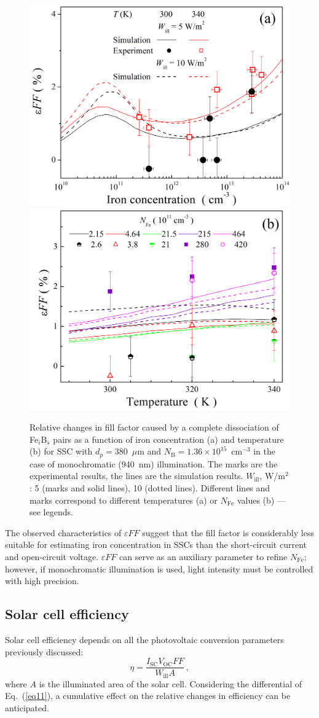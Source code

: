\documentclass[a4paper,fleqn]{cas-sc}
\begin{document}
\begin{figure}
	\centering
     \includegraphics[width=0.4\linewidth]{Fig9a.png}
     \includegraphics[width=0.4\linewidth]{Fig9b.png}
	  \caption{Relative changes in fill factor caused by a complete
       dissociation of Fe$_i$B$_s$ pairs as a function of iron concentration (a) and
       temperature (b) for SSC with $d_p=380$~$\mu$m and $N_\mathrm{B}=1.36\times10^{15}$~cm$^{-3}$
       in the case of monochromatic (940~nm) illumination.
       The marks are the experimental results, the lines are the simulation results.
       $W_\mathrm{ill}$, W/m$^{2}$: 5 (marks and solid lines), 10 (dotted lines).
       Different lines and marks correspond to different temperatures (a) or $N_\mathrm{Fe}$ values (b) --- see legends.
}\label{fig9}
\end{figure}

The observed characteristics of $\varepsilon F\!F$ suggest that
the fill factor is considerably less suitable for estimating iron concentration in SSCs
than the short-circuit current and open-circuit voltage.
$\varepsilon F\!F$ can serve as an auxiliary parameter to refine $N_\mathrm{Fe}$;
however, if monochromatic illumination is used, light intensity must be controlled with high precision.



\subsection{Solar cell efficiency}

Solar cell efficiency depends on all the photovoltaic conversion parameters previously discussed:
\begin{equation}
\label{eq11}
    \eta = \frac{I_\mathrm{SC}V_\mathrm{OC}F\!F}{W_\mathrm{ill}A}\,,
\end{equation}
where
$A$ is the illuminated area of the solar cell.
Considering the differential of Eq.~(\ref{eq11}), a cumulative effect on the relative changes in efficiency can be anticipated.
\end{document}
